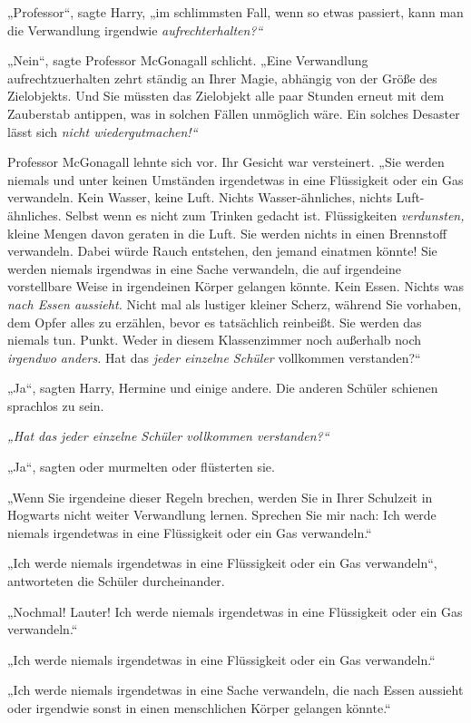 {„Professor“, sagte Harry, „im schlimmsten Fall, wenn so etwas passiert, kann man die Verwandlung irgendwie \emph{aufrechterhalten?“}

„Nein“, sagte Professor McGonagall schlicht. „Eine Verwandlung aufrechtzuerhalten zehrt ständig an Ihrer Magie, abhängig von der Größe des Zielobjekts. Und Sie müssten das Zielobjekt alle paar Stunden erneut mit dem Zauberstab antippen, was in solchen Fällen unmöglich wäre. Ein solches Desaster lässt sich \emph{nicht wiedergutmachen!“}

Professor McGonagall lehnte sich vor. Ihr Gesicht war versteinert. „Sie werden niemals und unter keinen Umständen irgendetwas in eine Flüssigkeit oder ein Gas verwandeln. Kein Wasser, keine Luft. Nichts Wasser-ähnliches, nichts Luft-ähnliches. Selbst wenn es nicht zum Trinken gedacht ist. Flüssigkeiten \emph{verdunsten,} kleine Mengen davon geraten in die Luft. Sie werden nichts in einen Brennstoff verwandeln. Dabei würde Rauch entstehen, den jemand einatmen könnte! Sie werden niemals irgendwas in eine Sache verwandeln, die auf irgendeine vorstellbare Weise in irgendeinen Körper gelangen könnte. Kein Essen. Nichts was \emph{nach Essen aussieht.} Nicht mal als lustiger kleiner Scherz, während Sie vorhaben, dem Opfer alles zu erzählen, bevor es tatsächlich reinbeißt. Sie werden das niemals tun. Punkt. Weder in diesem Klassenzimmer noch außerhalb noch \emph{irgendwo anders.} Hat das \emph{jeder einzelne Schüler} vollkommen verstanden?“

„Ja“, sagten Harry, Hermine und einige andere. Die anderen Schüler schienen sprachlos zu sein.

\emph{„Hat das jeder einzelne Schüler vollkommen verstanden?“}

„Ja“, sagten oder murmelten oder flüsterten sie.

„Wenn Sie irgendeine dieser Regeln brechen, werden Sie in Ihrer Schulzeit in Hogwarts nicht weiter Verwandlung lernen. Sprechen Sie mir nach: Ich werde niemals irgendetwas in eine Flüssigkeit oder ein Gas verwandeln.“

„Ich werde niemals irgendetwas in eine Flüssigkeit oder ein Gas verwandeln“, antworteten die Schüler durcheinander.

„Nochmal! Lauter! Ich werde niemals irgendetwas in eine Flüssigkeit oder ein Gas verwandeln.“

„Ich werde niemals irgendetwas in eine Flüssigkeit oder ein Gas verwandeln.“

„Ich werde niemals irgendetwas in eine Sache verwandeln, die nach Essen aussieht oder irgendwie sonst in einen menschlichen Körper gelangen könnte.“

}

